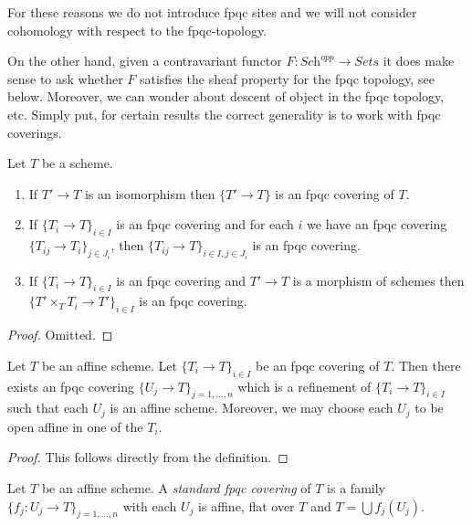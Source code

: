 \medskip\noindent
For these reasons we do not introduce fpqc sites and we will not consider
cohomology with respect to the fpqc-topology.

\medskip\noindent
On the other hand, given a contravariant functor
$F : \textit{Sch}^{opp} \to \textit{Sets}$
it does make sense to ask whether $F$ satisfies the sheaf property
for the fpqc topology, see below.
Moreover, we can wonder about descent of object
in the fpqc topology, etc. Simply put, for certain results the correct
generality is to work with fpqc coverings.

\begin{lemma}
\label{lemma-fpqc}
Let $T$ be a scheme.
\begin{enumerate}
\item If $T' \to T$ is an isomorphism then $\{T' \to T\}$
is an fpqc covering of $T$.
\item If $\{T_i \to T\}_{i\in I}$ is an fpqc covering and for each
$i$ we have an fpqc covering $\{T_{ij} \to T_i\}_{j\in J_i}$, then
$\{T_{ij} \to T\}_{i \in I, j\in J_i}$ is an fpqc covering.
\item If $\{T_i \to T\}_{i\in I}$ is an fpqc covering
and $T' \to T$ is a morphism of schemes then
$\{T' \times_T T_i \to T'\}_{i\in I}$ is an fpqc covering.
\end{enumerate}
\end{lemma}

\begin{proof}
Omitted.
\end{proof}

\begin{lemma}
\label{lemma-fpqc-affine}
Let $T$ be an affine scheme.
Let $\{T_i \to T\}_{i \in I}$ be an fpqc covering of $T$.
Then there exists an fpqc covering
$\{U_j \to T\}_{j = 1, \ldots, n}$ which is a refinement
of $\{T_i \to T\}_{i \in I}$ such that each $U_j$ is an affine
scheme. Moreover, we may choose each $U_j$ to be open affine
in one of the $T_i$.
\end{lemma}

\begin{proof}
This follows directly from the definition.
\end{proof}

\begin{definition}
\label{definition-standard-fpqc}
Let $T$ be an affine scheme. A {\it standard fpqc covering}
of $T$ is a family $\{f_j : U_j \to T\}_{j = 1, \ldots, n}$
with each $U_j$ is affine, flat over $T$ and $T = \bigcup f_j(U_j)$.
\end{definition}

